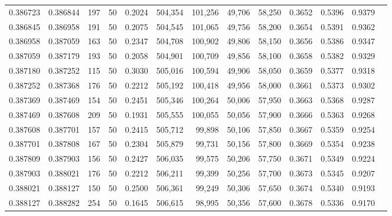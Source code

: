 \begin{tabular}{rrrrrrrrrrrrr}
0.386723 & 0.386844 &   197 &  50 &                                     0.2024 & 504,354 & 101,256 &  49,706 &  58,250 & 0.3652 & 0.5396 & 0.9379 \\
0.386845 & 0.386958 &   191 &  50 &                                     0.2075 & 504,545 & 101,065 &  49,756 &  58,200 & 0.3654 & 0.5391 & 0.9362 \\
0.386958 & 0.387059 &   163 &  50 &                                     0.2347 & 504,708 & 100,902 &  49,806 &  58,150 & 0.3656 & 0.5386 & 0.9347 \\
0.387059 & 0.387179 &   193 &  50 &                                     0.2058 & 504,901 & 100,709 &  49,856 &  58,100 & 0.3658 & 0.5382 & 0.9329 \\
0.387180 & 0.387252 &   115 &  50 &                                     0.3030 & 505,016 & 100,594 &  49,906 &  58,050 & 0.3659 & 0.5377 & 0.9318 \\
0.387252 & 0.387368 &   176 &  50 &                                     0.2212 & 505,192 & 100,418 &  49,956 &  58,000 & 0.3661 & 0.5373 & 0.9302 \\
0.387369 & 0.387469 &   154 &  50 &                                     0.2451 & 505,346 & 100,264 &  50,006 &  57,950 & 0.3663 & 0.5368 & 0.9287 \\
0.387469 & 0.387608 &   209 &  50 &                                     0.1931 & 505,555 & 100,055 &  50,056 &  57,900 & 0.3666 & 0.5363 & 0.9268 \\
0.387608 & 0.387701 &   157 &  50 &                                     0.2415 & 505,712 &  99,898 &  50,106 &  57,850 & 0.3667 & 0.5359 & 0.9254 \\
0.387701 & 0.387808 &   167 &  50 &                                     0.2304 & 505,879 &  99,731 &  50,156 &  57,800 & 0.3669 & 0.5354 & 0.9238 \\
0.387809 & 0.387903 &   156 &  50 &                                     0.2427 & 506,035 &  99,575 &  50,206 &  57,750 & 0.3671 & 0.5349 & 0.9224 \\
0.387903 & 0.388021 &   176 &  50 &                                     0.2212 & 506,211 &  99,399 &  50,256 &  57,700 & 0.3673 & 0.5345 & 0.9207 \\
0.388021 & 0.388127 &   150 &  50 &                                     0.2500 & 506,361 &  99,249 &  50,306 &  57,650 & 0.3674 & 0.5340 & 0.9193 \\
0.388127 & 0.388282 &   254 &  50 &                                     0.1645 & 506,615 &  98,995 &  50,356 &  57,600 & 0.3678 & 0.5336 & 0.9170 \\

\end{tabular}
